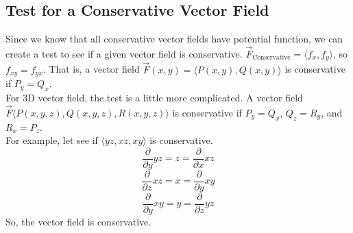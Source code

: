 \subsection{Test for a Conservative Vector Field}
\noindent
Since we know that all conservative vector fields have potential function, we can create a test to see if a given vector field is conservative. $\vec{F}_{\text{Conservative}} = \langle f_x, f_y \rangle$, so $f_{xy} = f_{yx}$. That is, a vector field $\vec{F}(x,y) = \langle P(x,y), Q(x,y) \rangle$ is conservative if $P_y = Q_x$.\\
For 3D vector field, the test is a little more complicated. A vector field $\vec{F}\langle P(x,y,z), Q(x,y,z), R(x,y,z)\rangle$ is conservative if $P_y = Q_x$, $Q_z = R_y$, and $R_x = P_z$.\\

\noindent
For example, let see if $\langle yz, xz, xy\rangle$ is conservative.
\begin{equation*}
	\frac{\partial}{\partial y}yz = z = \frac{\partial}{\partial x}xz
\end{equation*}
\begin{equation*}
	\frac{\partial}{\partial z}xz = x = \frac{\partial}{\partial y}xy
\end{equation*}
\begin{equation*}
	\frac{\partial}{\partial y}xy = y = \frac{\partial}{\partial z}yz
\end{equation*}
So, the vector field is conservative.